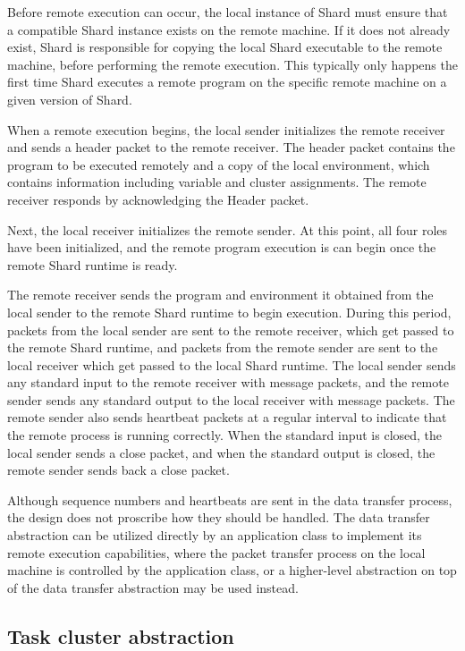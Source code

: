 \documentclass[twoside]{report}
\begin{document}
Before remote execution can occur, the local instance of Shard must ensure that a compatible Shard instance exists on the remote machine.
If it does not already exist, Shard is responsible for copying the local Shard executable to the remote machine, before performing the remote execution.
This typically only happens the first time Shard executes a remote program on the specific remote machine on a given version of Shard.

When a remote execution begins, the local sender initializes the remote receiver and sends a header packet to the remote receiver.
The header packet contains the program to be executed remotely and a copy of the local environment, which contains information including variable and cluster assignments.
The remote receiver responds by acknowledging the Header packet.

Next, the local receiver initializes the remote sender.
At this point, all four roles have been initialized, and the remote program execution is can begin once the remote Shard runtime is ready.

The remote receiver sends the program and environment it obtained from the local sender to the remote Shard runtime to begin execution.
During this period, packets from the local sender are sent to the remote receiver, which get passed to the remote Shard runtime, and packets from the remote sender are sent to the local receiver which get passed to the local Shard runtime.
The local sender sends any standard input to the remote receiver with message packets, and the remote sender sends any standard output to the local receiver with message packets.
The remote sender also sends heartbeat packets at a regular interval to indicate that the remote process is running correctly.
When the standard input is closed, the local sender sends a close packet, and when the standard output is closed, the remote sender sends back a close packet.

Although sequence numbers and heartbeats are sent in the data transfer process, the design does not proscribe how they should be handled.
The data transfer abstraction can be utilized directly by an application class to implement its remote execution capabilities, where the packet transfer process on the local machine is controlled by the application class, or a higher-level abstraction on top of the data transfer abstraction may be used instead.

\subsection{Task cluster abstraction}
\end{document}
